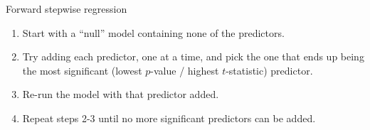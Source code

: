 \documentclass{beamer}\usepackage[]{graphicx}\usepackage[]{color}
\begin{document}
\begin{darkframes}
    \begin{frame}{Forward stepwise regression}
      \begin{enumerate}
        \item Start with a ``null'' model containing none of the predictors.
        \item Try adding each predictor, one at a time, and pick the one that ends up being the most significant (lowest $p$-value / highest $t$-statistic) predictor.
        \item Re-run the model with that predictor added.
        \item Repeat steps 2-3 until no more significant predictors can be added.
      \end{enumerate}
    \end{frame}
  \end{darkframes}
\end{document}
